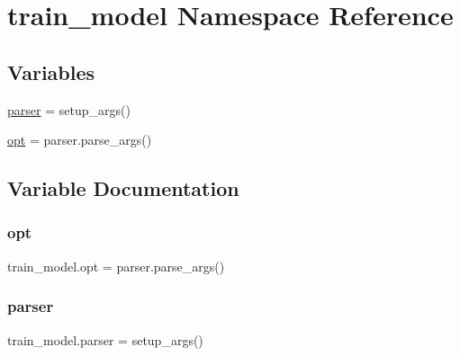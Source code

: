 \hypertarget{namespacetrain__model}{}\section{train\+\_\+model Namespace Reference}
\label{namespacetrain__model}
\subsection*{Variables}
\begin{DoxyCompactItemize}
\item 
\hyperlink{namespacetrain__model_ab036cc629f61c94d93f79d9071e25e62}{parser} = setup\+\_\+args()
\item 
\hyperlink{namespacetrain__model_a81a7509e6c032fb47a5d28990039557a}{opt} = parser.\+parse\+\_\+args()
\end{DoxyCompactItemize}


\subsection{Variable Documentation}
\mbox{\label{namespacetrain__model_a81a7509e6c032fb47a5d28990039557a}} 
\subsubsection{\texorpdfstring{opt}{opt}}
{\footnotesize\ttfamily train\+\_\+model.\+opt = parser.\+parse\+\_\+args()}

\mbox{\label{namespacetrain__model_ab036cc629f61c94d93f79d9071e25e62}} 
\subsubsection{\texorpdfstring{parser}{parser}}
{\footnotesize\ttfamily train\+\_\+model.\+parser = setup\+\_\+args()}

